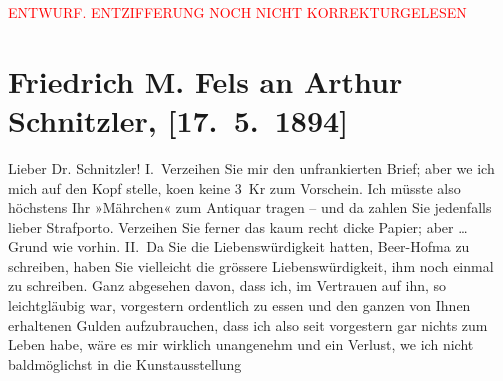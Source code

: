 
\begin{center}
            \textcolor{red}{ENTWURF. ENTZIFFERUNG NOCH NICHT KORREKTURGELESEN}
                      \end{center}
            
               \section[Friedrich M. Fels an Arthur Schnitzler, {[}17. 5. 1894{]}]{ Friedrich M. Fels an Arthur Schnitzler, {[}17. 5. 1894{]}}\nopagebreak{}\rehead{ }\begin{ledgroupsized}[t]{13cm}\normalsize\beginnumbering{} \toendnotes[C]{\smallbreak\pagebreak[2]} 
\toendnotes[C]{\smallbreak}\pstart{}{\pb}Lieber Dr. Schnitzler!\pend\pstart
           I. Verzeihen Sie mir den unfrankierten Brief; aber we{\geminationn} ich mich auf den Kopf stelle, ko{\geminationm}en keine 3 Kr
                    zum Vorschein. Ich müsste also höchstens Ihr »Mährchen« zum Antiquar tragen – und da zahlen Sie jedenfalls lieber
                    Strafporto. Verzeihen Sie ferner das kaum recht dicke Papier; aber {\dots} Grund wie vorhin.\pend
           \pstart
           II. Da Sie die Liebenswürdigkeit hatten, Beer-Hofma{\geminationn} zu schreiben, haben Sie vielleicht die grössere Liebenswürdigkeit, ihm
                    noch einmal zu schreiben. Ganz abgesehen davon, dass ich, im Vertrauen auf ihn,
                    so leichtgläubig war, vorgestern ordentlich zu essen und den ganzen von Ihnen
                    erhaltenen Gulden aufzubrauchen, dass ich also seit vorgestern gar nichts zum
                    Leben habe, wäre es mir wirklich unangenehm und ein Verlust, we{\geminationn} ich nicht baldmöglichst in die Kunstausstellung

\end{ledgroupsized}
